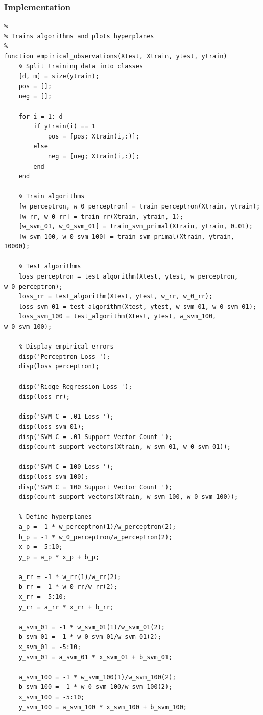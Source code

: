 \documentclass[11pt, oneside]{article}   	%
\begin{document}
\subsubsection{Implementation}
\begin{verbatim}
%
% Trains algorithms and plots hyperplanes
%
function empirical_observations(Xtest, Xtrain, ytest, ytrain)
    % Split training data into classes
    [d, m] = size(ytrain);
    pos = [];
    neg = [];
    
    for i = 1: d
        if ytrain(i) == 1
            pos = [pos; Xtrain(i,:)];
        else
            neg = [neg; Xtrain(i,:)];
        end
    end
    
    % Train algorithms
    [w_perceptron, w_0_perceptron] = train_perceptron(Xtrain, ytrain);
    [w_rr, w_0_rr] = train_rr(Xtrain, ytrain, 1);
    [w_svm_01, w_0_svm_01] = train_svm_primal(Xtrain, ytrain, 0.01);
    [w_svm_100, w_0_svm_100] = train_svm_primal(Xtrain, ytrain, 10000);
    
    % Test algorithms
    loss_perceptron = test_algorithm(Xtest, ytest, w_perceptron, w_0_perceptron);
    loss_rr = test_algorithm(Xtest, ytest, w_rr, w_0_rr);
    loss_svm_01 = test_algorithm(Xtest, ytest, w_svm_01, w_0_svm_01);
    loss_svm_100 = test_algorithm(Xtest, ytest, w_svm_100, w_0_svm_100);
    
    % Display empirical errors
    disp('Perceptron Loss ');
    disp(loss_perceptron);
    
    disp('Ridge Regression Loss ');
    disp(loss_rr);
    
    disp('SVM C = .01 Loss ');
    disp(loss_svm_01);
    disp('SVM C = .01 Support Vector Count ');
    disp(count_support_vectors(Xtrain, w_svm_01, w_0_svm_01));
    
    disp('SVM C = 100 Loss ');
    disp(loss_svm_100);
    disp('SVM C = 100 Support Vector Count ');
    disp(count_support_vectors(Xtrain, w_svm_100, w_0_svm_100));
    
    % Define hyperplanes
    a_p = -1 * w_perceptron(1)/w_perceptron(2);
    b_p = -1 * w_0_perceptron/w_perceptron(2);
    x_p = -5:10;
    y_p = a_p * x_p + b_p;
    
    a_rr = -1 * w_rr(1)/w_rr(2);
    b_rr = -1 * w_0_rr/w_rr(2);
    x_rr = -5:10;
    y_rr = a_rr * x_rr + b_rr;

    a_svm_01 = -1 * w_svm_01(1)/w_svm_01(2);
    b_svm_01 = -1 * w_0_svm_01/w_svm_01(2);
    x_svm_01 = -5:10;
    y_svm_01 = a_svm_01 * x_svm_01 + b_svm_01;

    a_svm_100 = -1 * w_svm_100(1)/w_svm_100(2);
    b_svm_100 = -1 * w_0_svm_100/w_svm_100(2);
    x_svm_100 = -5:10;
    y_svm_100 = a_svm_100 * x_svm_100 + b_svm_100;
    

\end{verbatim}
\end{document}
